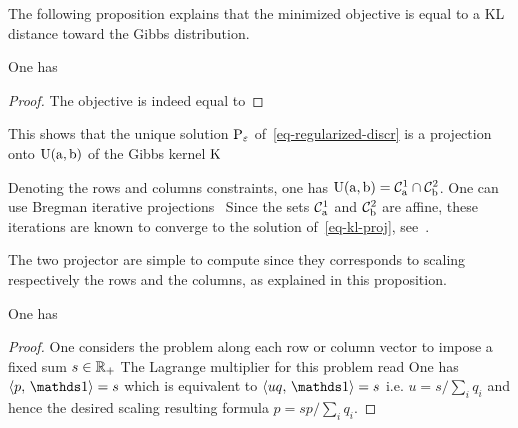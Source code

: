 The following proposition explains that the minimized objective is equal to a KL distance toward the Gibbs distribution.

\begin{prop} 
One has 
\end{prop}
\begin{proof}
The objective is indeed equal to
\end{proof}

This shows that the unique solution $\P_\epsilon$ of~\eqref{eq-regularized-discr} is a projection onto $\CouplingsD(\a,\b)$ of the Gibbs kernel $\K$

Denoting 
the rows and columns constraints, one has $\CouplingsD(\a,\b) = \Cc^1_\a \cap \Cc^2_\b$. One can use Bregman iterative projections~\cite{bregman1967relaxation}
Since the sets $\Cc^1_\a$ and $\Cc^2_\b$ are affine, these iterations are known to converge to the solution of~\eqref{eq-kl-proj}, see~\cite{bregman1967relaxation}. 

The two projector are simple to compute since they corresponds to scaling respectively the rows and the columns, as explained in this proposition.

\begin{prop}
One has 
\end{prop}
\begin{proof}
	One considers the problem along each row or column vector to impose a fixed sum $s \in \RR_+$
	The Lagrange multiplier for this problem read
	One has $\dotp{p}{\ones} = s$ which is equivalent to $\dotp{uq}{\ones}=s$ i.e. $u=s/\sum_i q_i$ and hence the desired scaling resulting formula 
	$p=s p/\sum_i q_i$. 
\end{proof}

